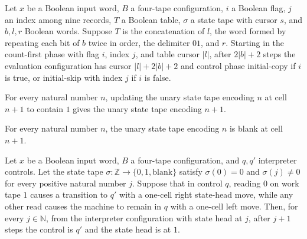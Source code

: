\begin{lemma}
\label{Turing.timedCut_count_run}
\leanok
{}
Let $x$ be a Boolean input word, $B$ a four-tape configuration, $i$ a Boolean flag, $j$
an index among nine records, $T$ a Boolean table, $\sigma$ a state tape with cursor $s$,
and $b,l,r$ Boolean words. Suppose $T$ is the concatenation of $l$, the word formed by
repeating each bit of $b$ twice in order, the delimiter $01$, and $r$. Starting in the
count-first phase with flag $i$, index $j$, and table cursor $|l|$, after $2|b|+2$ steps
the evaluation configuration has cursor $|l|+2|b|+2$ and control phase initial-copy if
$i$ is true, or initial-skip with index $j$ if $i$ is false.
\end{lemma}

\begin{lemma}
\label{Turing.timedCut_StateTape_append}
\leanok
{}
For every natural number $n$, updating the unary state tape encoding $n$ at cell $n+1$
to contain $1$ gives the unary state tape encoding $n+1$.
\end{lemma}

\begin{lemma}
\label{Turing.timedCut_StateTape_end}
\leanok
{}
For every natural number $n$, the unary state tape encoding $n$ is blank at cell $n+1$.
\end{lemma}

\begin{lemma}
\label{Turing.timedCut_state_rewind}
\leanok
{}
Let $x$ be a Boolean input word, $B$ a four-tape configuration, and $q,q'$ interpreter
controls. Let the state tape $\sigma:\mathbb{Z}\to\{0,1,\mathrm{blank}\}$ satisfy
$\sigma(0)=0$ and $\sigma(j)\ne0$ for every positive natural number $j$. Suppose that in
control $q$, reading $0$ on work tape $1$ causes a transition to $q'$ with a one-cell
right state-head move, while any other read causes the machine to remain in $q$ with a
one-cell left move. Then, for every $j\in\mathbb{N}$, from the interpreter configuration
with state head at $j$, after $j+1$ steps the control is $q'$ and the state head is at
$1$.
\end{lemma}

